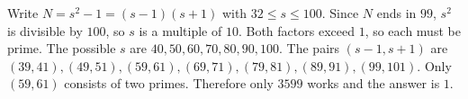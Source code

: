 Write $N=s^2-1=(s-1)(s+1)$ with $32\le s\le100$. Since $N$ ends in $99$, $s^2$ is divisible by $100$, so $s$ is a multiple of $10$. Both factors exceed $1$, so each must be prime. The possible $s$ are $40,50,60,70,80,90,100$. The pairs $(s-1,s+1)$ are $(39,41),(49,51),(59,61),(69,71),(79,81),(89,91),(99,101)$. Only $(59,61)$ consists of two primes. Therefore only $3599$ works and the answer is $\boxed1$.
